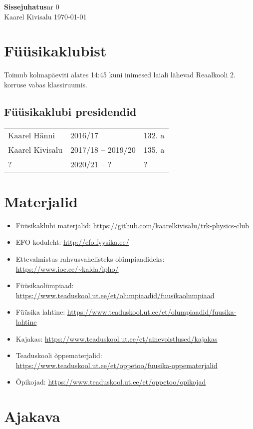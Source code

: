 \documentclass[a4paper,11pt,twocolumn]{article}
\begin{document}
{\huge \textbf{Sissejuhatus}\hfill \normalsize {nr 0}} \\
{Kaarel Kivisalu \hfill \today}

\section{Füüsikaklubist}

Toimub kolmapäeviti alates 14:45 kuni inimesed laiali lähevad Reaalkooli 2. korruse vabas klassiruumis.

\subsection{Füüsikaklubi presidendid}
\begin{tabular}{l l l}
    Kaarel Hänni & 2016/17 & 132. a \\
    Kaarel Kivisalu & 2017/18 -- 2019/20 & 135. a \\
    ? & 2020/21 -- ? & ? \\
\end{tabular}

\section{Materjalid}

\begin{itemize}
\item Füüsikaklubi materjalid: \url{https://github.com/kaarelkivisalu/trk-physics-club}
\item EFO koduleht: \url{http://efo.fyysika.ee/}
\item Ettevalmistus rahvusvahelisteks olümpiaadideks: \url{https://www.ioc.ee/~kalda/ipho/}
\item Füüsikaolümpiaad: \url{https://www.teaduskool.ut.ee/et/olumpiaadid/fuusikaolumpiaad}
\item Füüsika lahtine: \url{https://www.teaduskool.ut.ee/et/olumpiaadid/fuusika-lahtine}
\item Kajakas: \url{https://www.teaduskool.ut.ee/et/ainevoistlused/kajakas}
\item Teaduskooli õppematerjalid: \url{https://www.teaduskool.ut.ee/et/oppetoo/fuusika-oppematerjalid}
\item Õpikojad: \url{https://www.teaduskool.ut.ee/et/oppetoo/opikojad}
\end{itemize}

\section{Ajakava}
\end{document}
